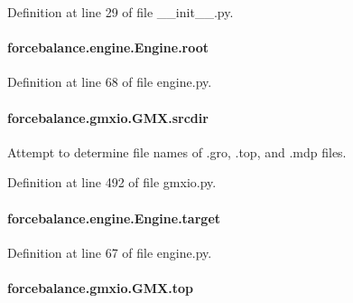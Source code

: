 Definition at line 29 of file \-\_\-\-\_\-init\-\_\-\-\_\-.\-py.

\hypertarget{classforcebalance_1_1engine_1_1Engine_a82e9382a3316d3e26ef29efb58db4a00}{
\paragraph[{root}]{\setlength{\rightskip}{0pt plus 5cm}forcebalance.\-engine.\-Engine.\-root\hspace{0.3cm}{\ttfamily [inherited]}}}\label{classforcebalance_1_1engine_1_1Engine_a82e9382a3316d3e26ef29efb58db4a00}


Definition at line 68 of file engine.\-py.

\hypertarget{classforcebalance_1_1gmxio_1_1GMX_aa659f4e669182ddb70d6146150bfb63b}{
\paragraph[{srcdir}]{\setlength{\rightskip}{0pt plus 5cm}forcebalance.\-gmxio.\-G\-M\-X.\-srcdir}}\label{classforcebalance_1_1gmxio_1_1GMX_aa659f4e669182ddb70d6146150bfb63b}


Attempt to determine file names of .gro, .top, and .mdp files. 



Definition at line 492 of file gmxio.\-py.

\hypertarget{classforcebalance_1_1engine_1_1Engine_a1fdd29fbd127cba331326a3557558e2a}{
\paragraph[{target}]{\setlength{\rightskip}{0pt plus 5cm}forcebalance.\-engine.\-Engine.\-target\hspace{0.3cm}{\ttfamily [inherited]}}}\label{classforcebalance_1_1engine_1_1Engine_a1fdd29fbd127cba331326a3557558e2a}


Definition at line 67 of file engine.\-py.

\hypertarget{classforcebalance_1_1gmxio_1_1GMX_acdd7f2bbbdbb41c9abcfafb1c22751fe}{
\paragraph[{top}]{\setlength{\rightskip}{0pt plus 5cm}forcebalance.\-gmxio.\-G\-M\-X.\-top}}\label{classforcebalance_1_1gmxio_1_1GMX_acdd7f2bbbdbb41c9abcfafb1c22751fe}


